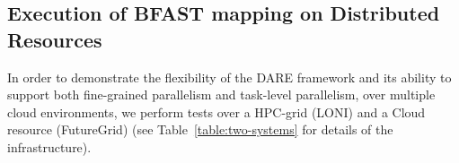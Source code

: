 \documentclass{cpeauth}
\begin{document}








\subsection{Execution of BFAST mapping on Distributed Resources}

In order to demonstrate the flexibility of the DARE framework and its
ability to support both fine-grained parallelism and task-level
parallelism, over multiple cloud environments, we perform tests over a
HPC-grid (LONI) and a Cloud resource (FutureGrid) (see
Table~\ref{table:two-systems} for details of the infrastructure).
\end{document}

